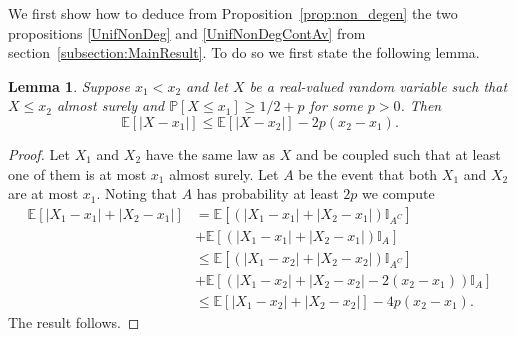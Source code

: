 \documentclass[10pt, english,oneside,reqno]{amsart}
\theoremstyle{plain}
\newtheorem{corollary}[theorem]{Corollary}
\newtheorem{lemma}[theorem]{Lemma}
\theoremstyle{remark}
\numberwithin{equation}{section}
\numberwithin{figure}{section}
\newcommand{\R}{\mathbb{R}}
\begin{document}


We first show how to deduce from Proposition~\ref{prop:non_degen} the two propositions \ref{UnifNonDeg} and \ref{UnifNonDegContAv} from section~\ref{subsection:MainResult}. To do so we first state the following lemma.

\begin{lemma} \label{lemm:distance_estimate}
	Suppose $x_1 < x_2$ and let $X$ be a real-valued random variable such that $X \leq x_2$ almost surely and $\mathbb{P}[X \leq x_1] \geq 1/2 +p$ for some $p > 0$. Then $$\mathbb{E}[|X-x_1|] \leq \mathbb{E}[| X - x_2 |] - 2 p (x_2 - x_1).$$ 
\end{lemma}

\begin{proof}
	Let $X_1$ and $X_2$ have the same law as $X$ and be coupled such that at least one of them is at most $x_1$ almost surely. Let $A$ be the event that both $X_1$ and $X_2$ are at most $x_1$. Noting that $A$ has probability at least $2p$ we compute
	\begin{align*}
	\mathbb{E} [ |X_1 - x_1| + |X_2 - x_1|] &= \mathbb{E} [ (|X_1 - x_1| + |X_2 - x_1|) \mathbb{I}_{A^C}] \\ &+ \mathbb{E} [ (|X_1 - x_1| + |X_2 - x_1|) \mathbb{I}_{A}]\\
	&\leq \mathbb{E} [ (|X_1 - x_2| + |X_2 - x_2|) \mathbb{I}_{A^C}] \\ &+ \mathbb{E} [ (|X_1 - x_2| + |X_2 - x_2| - 2 (x_2 - x_1)) \mathbb{I}_{A}]\\
	&\leq \mathbb{E} [ |X_1 - x_2| + |X_2 - x_2|] - 4p (x_2 - x_1).
	\end{align*}
	The result follows.
\end{proof}
\end{document}
